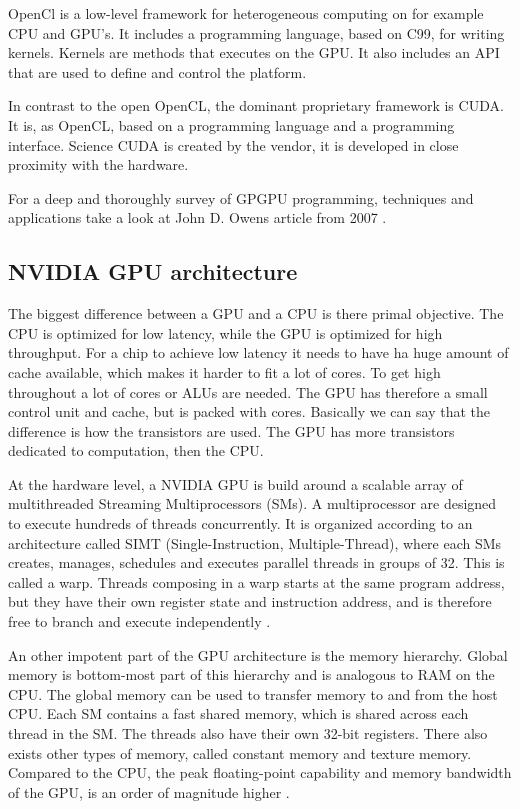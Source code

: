 OpenCl is a low-level framework for heterogeneous computing on for example CPU and GPU's. It includes a programming language, based on C99, for writing kernels. Kernels are methods that executes on the GPU. It also includes an API that are used to define and control the platform.

In contrast to the open OpenCL, the dominant proprietary framework is CUDA. It is, as OpenCL, based on a programming language and a programming interface. Science CUDA is created by the vendor, it is developed in close proximity with the hardware.

For a deep and thoroughly survey of GPGPU programming, techniques and applications take a look at John D. Owens article from 2007 \citep{Owens:2007:ASO}.


\subsection{NVIDIA GPU architecture} %
\label{ssub:nvidia_gpu_architecture}


The biggest difference between a GPU and a CPU is there primal objective. The CPU is optimized for low latency, while the GPU is optimized for high throughput. For a chip to achieve low latency it needs to have ha huge amount of cache available, which makes it harder to fit a lot of cores. To get high throughout a lot of cores or ALUs are needed. The GPU has therefore a small control unit and cache, but is packed with cores. Basically we can say that the difference is how the transistors are used. The GPU has more transistors dedicated to computation, then the CPU.

At the hardware level, a NVIDIA GPU is build around a scalable array of multithreaded Streaming Multiprocessors (SMs). A multiprocessor are designed to execute hundreds of threads concurrently. It is organized according to an architecture called SIMT (Single-Instruction, Multiple-Thread), where each SMs creates, manages, schedules and executes parallel threads in groups of 32. This is called a warp. Threads composing in a warp starts at the same program address, but they have their own register state and instruction address, and is therefore free to branch and execute independently \citep{cuda_programming_guide}.

An other impotent part of the GPU architecture is the memory hierarchy. Global memory is bottom-most part of this hierarchy and is analogous to RAM on the CPU. The global memory can be used to transfer memory to and from the host CPU. Each SM contains a fast shared memory, which is shared across each thread in the SM. The threads also have their own 32-bit registers. There also exists other types of memory, called constant memory and texture memory. Compared to the CPU, the peak floating-point capability and memory bandwidth of the GPU, is an order of magnitude higher \citep{Liangcu}.


